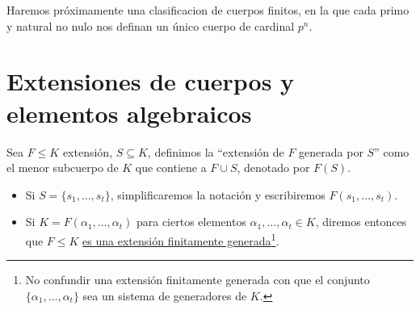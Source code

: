 \noindent
Haremos próximamente una clasificacion de cuerpos finitos, en la que cada primo y natural no nulo nos definan un único cuerpo de cardinal $p^n$.

\section{Extensiones de cuerpos y elementos algebraicos}

\begin{definicion}
    Sea $F\leq K$ extensión, $S\subseteq K$, definimos la ``extensión de $F$ generada por $S$'' como el menor subcuerpo de $K$ que contiene a $F\cup S$, denotado por $F(S)$.
    \begin{itemize}
        \item Si $S = \{s_1,\ldots,s_t\}$, simplificaremos la notación y escribiremos $F(s_1,\ldots,s_t)$.
        \item Si $K = F(\alpha_1, \ldots, \alpha_t)$ para ciertos elementos $\alpha_1, \ldots, \alpha_t\in K$, diremos entonces que $F\leq K$ \underline{es una extensión finitamente generada}\footnote{No confundir una extensión finitamente generada con que el conjunto $\{\alpha_1,\ldots,\alpha_t\}$ sea un sistema de generadores de $K$.}.
    \end{itemize}
\end{definicion}

